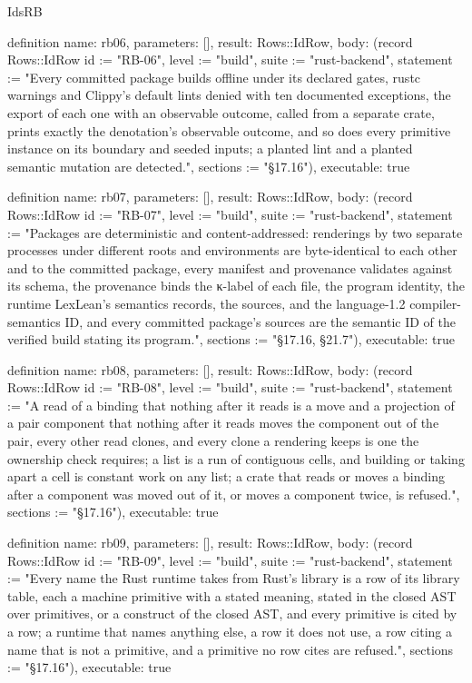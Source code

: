 \begin{lexlean}{IdsRB}
\begin{semanticmodule}
definition{
  name: rb06,
  parameters: [],
  result: Rows::IdRow,
  body: (record Rows::IdRow {id := "RB-06", level := "build", suite := "rust-backend", statement := "Every committed package builds offline under its declared gates, rustc warnings and Clippy's default lints denied with ten documented exceptions, the export of each one with an observable outcome, called from a separate crate, prints exactly the denotation's observable outcome, and so does every primitive instance on its boundary and seeded inputs; a planted lint and a planted semantic mutation are detected.", sections := "§17.16"}),
  executable: true
}

definition{
  name: rb07,
  parameters: [],
  result: Rows::IdRow,
  body: (record Rows::IdRow {id := "RB-07", level := "build", suite := "rust-backend", statement := "Packages are deterministic and content-addressed: renderings by two separate processes under different roots and environments are byte-identical to each other and to the committed package, every manifest and provenance validates against its schema, the provenance binds the κ-label of each file, the program identity, the runtime LexLean's semantics records, the sources, and the language-1.2 compiler-semantics ID, and every committed package's sources are the semantic ID of the verified build stating its program.", sections := "§17.16, §21.7"}),
  executable: true
}

definition{
  name: rb08,
  parameters: [],
  result: Rows::IdRow,
  body: (record Rows::IdRow {id := "RB-08", level := "build", suite := "rust-backend", statement := "A read of a binding that nothing after it reads is a move and a projection of a pair component that nothing after it reads moves the component out of the pair, every other read clones, and every clone a rendering keeps is one the ownership check requires; a list is a run of contiguous cells, and building or taking apart a cell is constant work on any list; a crate that reads or moves a binding after a component was moved out of it, or moves a component twice, is refused.", sections := "§17.16"}),
  executable: true
}

definition{
  name: rb09,
  parameters: [],
  result: Rows::IdRow,
  body: (record Rows::IdRow {id := "RB-09", level := "build", suite := "rust-backend", statement := "Every name the Rust runtime takes from Rust's library is a row of its library table, each a machine primitive with a stated meaning, stated in the closed AST over primitives, or a construct of the closed AST, and every primitive is cited by a row; a runtime that names anything else, a row it does not use, a row citing a name that is not a primitive, and a primitive no row cites are refused.", sections := "§17.16"}),
  executable: true
}


\end{semanticmodule}
\end{lexlean}
